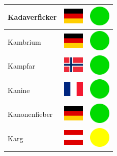 \documentclass[12pt, a4paper, twoside]{report}
\begin{document}
\begin{center}
\begin{longtable}{|p{5cm}|p{2cm}|p{2cm}|}
 Kadaverficker                                              & \includegraphics[width=1cm]{../img/flags/de} &   \includegraphics[width=1cm]{../likes/y} \\ \hline
 Kambrium                                                   & \includegraphics[width=1cm]{../img/flags/de} &   \includegraphics[width=1cm]{../likes/y} \\ \hline
 Kampfar                                                    & \includegraphics[width=1cm]{../img/flags/no} &   \includegraphics[width=1cm]{../likes/y} \\ \hline
 Kanine                                                     & \includegraphics[width=1cm]{../img/flags/fr} &   \includegraphics[width=1cm]{../likes/y} \\ \hline
 Kanonenfieber                                              & \includegraphics[width=1cm]{../img/flags/de} &   \includegraphics[width=1cm]{../likes/y} \\ \hline
 Karg                                                       & \includegraphics[width=1cm]{../img/flags/at} &   \includegraphics[width=1cm]{../likes/m} \\ \hline

\end{longtable}
\end{center}
\end{document}
